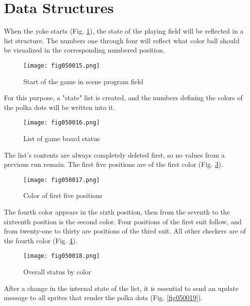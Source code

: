 \section{Data Structures}

When the yoke starts (Fig. \ref{fig050015}), the state of the playing field will be reflected in a list structure. The numbers one through four will reflect what color ball should be visualized in the corresponding numbered position.

\begin{figure}[H]
   \centering
   \texttt{[image: fig050015.png]}
   \caption{Start of the game in scene program field}
\label{fig050015}
\end{figure}

For this purpose, a "state" list is created, and the numbers defining the colors of the polka dots will be written into it.

\begin{figure}[H]
   \centering
   \texttt{[image: fig050016.png]}
   \caption{List of game board status}
\label{fig050016}
\end{figure}

The list's contents are always completely deleted first, so no values from a previous run remain. The first five positions are of the first color (Fig. \ref{fig050017}).

\begin{figure}[H]
   \centering
   \texttt{[image: fig050017.png]}
   \caption{Color of first five positions}
\label{fig050017}
\end{figure}

The fourth color appears in the sixth position, then from the seventh to the sixteenth position is the second color. Four positions of the first suit follow, and from twenty-one to thirty are positions of the third suit. All other checkers are of the fourth color (Fig. \ref{fig050018}).

\begin{figure}[H]
   \centering
   \texttt{[image: fig050018.png]}
   \caption{Overall status by color}
\label{fig050018}
\end{figure}

After a change in the internal state of the list, it is essential to send an update message to all sprites that render the polka dots (Fig. \ref{fig050019}).

